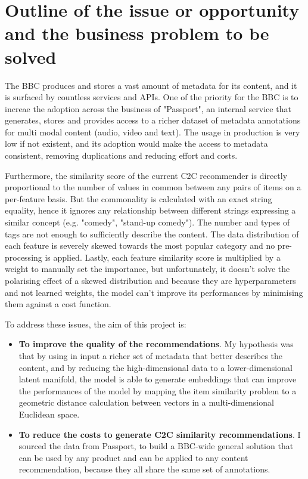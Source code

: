 
\section{Outline of the issue or opportunity and the business problem to be solved}

The BBC produces and stores a vast amount of metadata for its content, and it is surfaced by countless services and APIs.
One of the priority for the BBC is to increae the adoption across the business of "Passport", an internal service that generates,
stores and provides access to a richer dataset of metadata annotations for multi modal content (audio, video and text).
The usage in production is very low if not existent, and its adoption would make the access to metadata consistent,
removing duplications and reducing effort and costs.

Furthermore, the similarity score of the current C2C recommender is directly proportional to the number of values in common between any pairs of items
on a per-feature basis. But the commonality is calculated with an exact string equality, hence it ignores any relationship between different
strings expressing a similar concept (e.g. "comedy", "stand-up comedy"). The number and types of tags are not enough to sufficiently
describe the content. The data distribution of each feature
is severely skewed towards the most popular category and no pre-processing is applied. Lastly, each feature similarity score
is multiplied by a weight to manually set the importance, but unfortunately, it doesn't solve the polarising effect of a
skewed distribution and because they are hyperparameters and not learned weights, the model can't improve
its performances by minimising them against a cost function.

To address these issues, the aim of this project is:

\begin{itemize}
  \item \textbf{To improve the quality of the recommendations}. My hypothesis was that by using in input a richer set of metadata that
  better describes the content, and by reducing the high-dimensional data to a lower-dimensional latent manifold,
  the model is able to generate embeddings that can improve the performances of the model by mapping the
  item similarity problem to a geometric distance calculation between vectors in a multi-dimensional Euclidean space.
  \item \textbf{To reduce the costs to generate C2C similarity recommendations}. I sourced the
  data from Passport, to build a BBC-wide general solution that can be used by any product and can be applied to any content recommendation,
  because they all share the same set of annotations.
\end{itemize}
